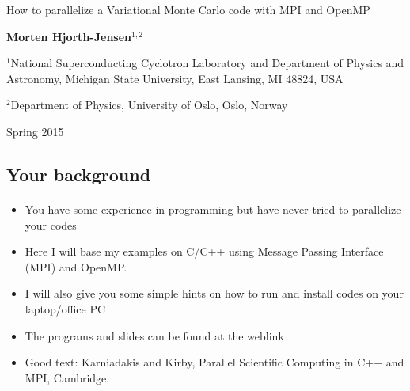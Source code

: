 \documentclass[%
twoside,                 %
final,                   %
10pt]{article}
\begin{document}






\thispagestyle{empty}

\begin{center}
{\LARGE\bf
\begin{spacing}{1.25}
How to parallelize a Variational Monte Carlo code with MPI and OpenMP
\end{spacing}
}
\end{center}


\begin{center}
{\bf Morten Hjorth-Jensen${}^{1, 2}$} \\ [0mm]
\end{center}

    \begin{center}
\centerline{{\small ${}^1$National Superconducting Cyclotron Laboratory and Department of Physics and Astronomy, Michigan State University, East Lansing, MI 48824, USA}}
\centerline{{\small ${}^2$Department of Physics, University of Oslo, Oslo, Norway}}
\end{center}
    

\begin{center} %
Spring 2015
\end{center}

\vspace{1cm}


\subsection{Your background}

\paragraph{}
\begin{itemize}
\item You have some experience in programming but have never tried to parallelize your codes

\item Here I will base my examples on C/C++ using Message Passing Interface (MPI) and OpenMP. 

\item I will also give you some simple hints on how to run and install codes on your laptop/office PC

\item The programs and slides can be found at the weblink

\item Good text: Karniadakis and Kirby, Parallel Scientific Computing in C++ and MPI, Cambridge.
\end{itemize}
\end{document}
